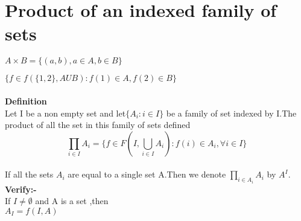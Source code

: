 \documentclass[a4paper,english,12pt]{article}   	%
\begin{document}
\section{Product of an indexed family of sets}
$ A \times B = \{(a,b), a \in A , b\in B\}$

$\{f\in f(\{1,2\},AUB):f(1)\in A, f(2)\in B\}$\\\\
\textbf{Definition}\\
Let I be a non empty set and let$\{A_i:i\in I\}$ be a family of set indexed by I.The product of all the set in this family of sets defined 
\begin{equation}
\prod_{i\in I}A_i =\{f\in F(I,\bigcup_{i \in I}A_i):f(i) \in A_i, \forall i \in I\}
\end{equation}\\
If all the sets $A_i$ are equal to a single set A.Then we denote $\prod_{i \in A_i}A_i$ by $A^I$.
\textbf{Verify:-}\\
If $I \neq \emptyset $ and A is a set ,then \\
$A_I =f(I,A)$ 
\end{document}
